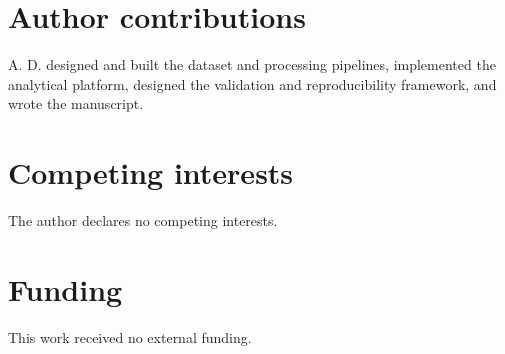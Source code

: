\documentclass[11pt,a4paper]{article}
\begin{document}
\section*{Author contributions}
A. D. designed and built the dataset and processing pipelines, implemented the analytical platform, designed the validation and reproducibility framework, and wrote the manuscript.

\section*{Competing interests}
The author declares no competing interests.

\section*{Funding}
This work received no external funding.
\end{document}
